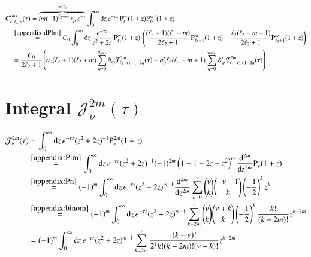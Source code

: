 \begin{align}
\nonumber
&C_{\ell_1\ell_2,p}^{(m)}(\tau) = \overbrace{i m (-1)^{\ell_2+m} \, r_p \, e^{-\tau}}^{\equiv C_0} \int_0^\infty \mathrm{d}z \, e^{-\tau z} \, {\text{P}_{\ell_1}^{m}}(1+z) {\text{P}_{\ell_2}^{m}}^\prime(1+z) \\
\nonumber
&\quad\overset{\eqref{appendix:dPlm}}{=} C_0 \int_0^\infty \mathrm{d}z \, \frac{e^{-\tau z}}{z^2+2z} \, {\text{P}_{\ell_1}^{m}}(1+z) \, \left( \frac{(\ell_2+1)(\ell_2+m)}{2\ell_2+1} {\text{P}_{\ell_2-1}^{m}}(1+z) - \frac{\ell_2(\ell_2-m+1)}{2\ell_2+1} {\text{P}_{\ell_2+1}^{m}}(1+z) \right) \\
&\quad = \frac{C_0}{2\ell_2+1} \left(
    a_0 (\ell_2+1)(\ell_2+m) \sum_{q=0}^{q_\text{max}} \tilde a_q \mathcal{J}_{\ell_1+\ell_2-1-2q}^{2m}(\tau)
    - a_0^\prime \ell_2(\ell_2-m+1) \sum_{q=0}^{{q_\text{max}}^\prime} \tilde a_q^\prime \mathcal{J}_{\ell_1+\ell_2+1-2q}^{2m}(\tau) \right)
\end{align}


\section{Integral $\mathcal{J}_\nu^{2m}(\tau)$}

\begin{align}
\nonumber
\mathcal{J}_\nu^{2m}(\tau) &= \int_0^\infty \mathrm{d}z \, e^{-\tau z} (z^2+2z)^{-1} {\text{P}_{\nu}^{2m}}(1+z) \\
\nonumber
&\overset{\eqref{appendix:Plm}}{=} \int_0^\infty \mathrm{d}z \, e^{-\tau z} (z^2+2z)^{-1} (-1)^{2m} \left(1-1-2z-z^2\right)^m \frac{\mathrm{d}^{2m}}{\mathrm{d}z^{2m}} {\text{P}_{\nu}^{}}(1+z) \\
\nonumber
&\overset{\eqref{appendix:Pn}}{=} (-1)^m \int_0^\infty \mathrm{d}z \, e^{-\tau z} (z^2+2z)^{m-1} \frac{\mathrm{d}^{2m}}{\mathrm{d}z^{2m}} \sum_{k=0}^\nu \binom{\nu}{k} \binom{-\nu-1}{k} \left(-\frac{1}{2}\right)^k z^k \\
\nonumber
&\overset{\eqref{appendix:binom}}{=} (-1)^m \int_0^\infty \mathrm{d}z \, e^{-\tau z} (z^2+2z)^{m-1} \sum_{k=2m}^\nu \binom{\nu}{k} \binom{\nu+k}{k} \left(+\frac{1}{2}\right)^k \frac{k!}{(k-2m)!} z^{k-2m} \\
&= (-1)^m \int_0^\infty \mathrm{d}z \, e^{-\tau z} (z^2+2z)^{m-1} \sum_{k=2m}^\nu \frac{(k+\nu)!}{2^k k! (k-2m)! (\nu-k)!} z^{k-2m}
\end{align}

